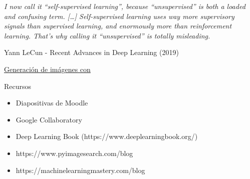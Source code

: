 \begin{frame}

{\Large\it I now call it ``self-supervised learning'', because ``unsupervised'' is both a loaded and confusing term. [\ldots] Self-supervised learning uses way more supervisory signals than supervised learning, and enormously more than reinforcement learning. That's why calling it ``unsupervised'' is totally misleading.}

\begin{flushright}
Yann LeCun - Recent Advances in Deep Learning (2019)
\end{flushright}
\end{frame}

\begin{exercise}
\href{https://colab.research.google.com/drive/11KvEtZmi33OrZVFO9uP9d68-nQrwfO-9}{Generación de imágenes con }
\end{exercise}


\begin{frame}{Recursos}
\begin{itemize}
    \item Diapositivas de Moodle
    \item Google Collaboratory
    \item Deep Learning Book (https://www.deeplearningbook.org/)
    \item https://www.pyimagesearch.com/blog
    \item https://machinelearningmastery.com/blog
\end{itemize}
\end{frame}







